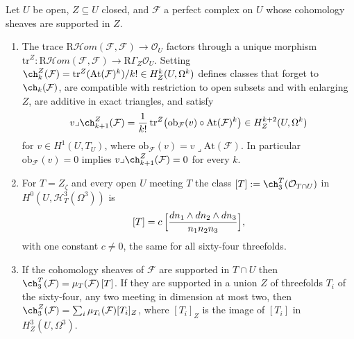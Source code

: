 \begin{lemma}\label{lem:chsupport}
Let $U$ be open, $Z\subseteq U$ closed, and $\mathcal{F}$ a perfect complex on $U$ whose cohomology sheaves are supported in $Z$.
\begin{enumerate}
\item[(i)] The trace $\mathrm{R}\mathcal{H}om(\mathcal{F},\mathcal{F})\to\mathcal{O}_{U}$ factors through a unique morphism $\mathrm{tr}^{Z}\colon\mathrm{R}\mathcal{H}om(\mathcal{F},\mathcal{F})\to\mathrm{R}\Gamma_{Z}\mathcal{O}_{U}$. Setting $\ch^{Z}_{k}(\mathcal{F})=\mathrm{tr}^{Z}(\mathrm{At}(\mathcal{F})^{k})/k!\in H^{k}_{Z}(U,\Omega^{k})$ defines classes that forget to $\ch_{k}(\mathcal{F})$, are compatible with restriction to open subsets and with enlarging $Z$, are additive in exact triangles, and satisfy
\[
v\lrcorner\ch^{Z}_{k+1}(\mathcal{F})=\frac{1}{k!}\,\mathrm{tr}^{Z}\bigl(\mathrm{ob}_{\mathcal{F}}(v)\circ\mathrm{At}(\mathcal{F})^{k}\bigr)\in H^{k+2}_{Z}(U,\Omega^{k})
\]
for $v\in H^{1}(U,T_{U})$, where $\mathrm{ob}_{\mathcal{F}}(v)=v\lrcorner\mathrm{At}(\mathcal{F})$. In particular $\mathrm{ob}_{\mathcal{F}}(v)=0$ implies $v\lrcorner\ch^{Z}_{k+1}(\mathcal{F})=0$ for every $k$.
\item[(ii)] For $T=Z_{\zeta}$ and every open $U$ meeting $T$ the class $[T]:=\ch^{T}_{3}(\mathcal{O}_{T\cap U})$ in $H^{0}(U,\mathcal{H}^{3}_{T}(\Omega^{3}))$ is
\[
[T]=c\,\Bigl[\frac{dn_{1}\wedge dn_{2}\wedge dn_{3}}{n_{1}n_{2}n_{3}}\Bigr],
\]
with one constant $c\ne0$, the same for all sixty-four threefolds.
\item[(iii)] If the cohomology sheaves of $\mathcal{F}$ are supported in $T\cap U$ then $\ch^{T}_{3}(\mathcal{F})=\mu_{T}(\mathcal{F})\,[T]$. If they are supported in a union $Z$ of threefolds $T_{i}$ of the sixty-four, any two meeting in dimension at most two, then $\ch^{Z}_{3}(\mathcal{F})=\sum_{i}\mu_{T_{i}}(\mathcal{F})[T_{i}]_{Z}$, where $[T_{i}]_{Z}$ is the image of $[T_{i}]$ in $H^{3}_{Z}(U,\Omega^{3})$.
\end{enumerate}
\end{lemma}


